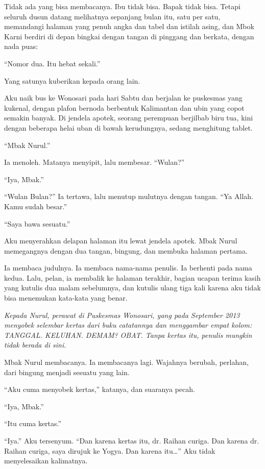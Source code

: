 \documentclass[11pt,twoside,openany]{book}
\makeatletter
\newcommand{\scenebreak}{\par\vspace{0.9em}{\centering\textsc{*\hspace{0.7em}*\hspace{0.7em}*}\par}\vspace{0.9em}\@afterindentfalse\@afterheading}
\makeatother
\begin{document}
Tidak ada yang bisa membacanya. Ibu tidak bisa. Bapak tidak bisa. Tetapi seluruh dusun datang melihatnya sepanjang bulan itu, satu per satu, memandangi halaman yang penuh angka dan tabel dan istilah asing, dan Mbok Karni berdiri di depan bingkai dengan tangan di pinggang dan berkata, dengan nada puas:

``Nomor dua. Itu hebat sekali.''

\scenebreak
Yang satunya kuberikan kepada orang lain.

Aku naik bus ke Wonosari pada hari Sabtu dan berjalan ke puskesmas yang kukenal, dengan plafon bernoda berbentuk Kalimantan dan ubin yang copot semakin banyak. Di jendela apotek, seorang perempuan berjilbab biru tua, kini dengan beberapa helai uban di bawah kerudungnya, sedang menghitung tablet.

``Mbak Nurul.''

Ia menoleh. Matanya menyipit, lalu membesar. ``Wulan?''

``Iya, Mbak.''

``Wulan Bulan?'' Ia tertawa, lalu menutup mulutnya dengan tangan. ``Ya Allah. Kamu sudah besar.''

``Saya bawa sesuatu.''

Aku menyerahkan delapan halaman itu lewat jendela apotek. Mbak Nurul memegangnya dengan dua tangan, bingung, dan membuka halaman pertama.

Ia membaca judulnya. Ia membaca nama-nama penulis. Ia berhenti pada nama kedua. Lalu, pelan, ia membalik ke halaman terakhir, bagian ucapan terima kasih yang kutulis dua malam sebelumnya, dan kutulis ulang tiga kali karena aku tidak bisa menemukan kata-kata yang benar.

\emph{Kepada Nurul, perawat di Puskesmas Wonosari, yang pada September 2013 menyobek selembar kertas dari buku catatannya dan menggambar empat kolom: TANGGAL. KELUHAN. DEMAM? OBAT. Tanpa kertas itu, penulis mungkin tidak berada di sini.}

Mbak Nurul membacanya. Ia membacanya lagi. Wajahnya berubah, perlahan, dari bingung menjadi sesuatu yang lain.

``Aku cuma menyobek kertas,'' katanya, dan suaranya pecah.

``Iya, Mbak.''

``Itu cuma kertas.''

``Iya.'' Aku tersenyum. ``Dan karena kertas itu, dr. Raihan curiga. Dan karena dr. Raihan curiga, saya dirujuk ke Yogya. Dan karena itu\ldots{}'' Aku tidak menyelesaikan kalimatnya.
\end{document}

